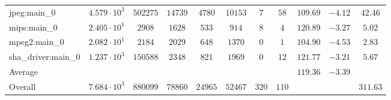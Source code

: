 \begin{tabular}{|l|c|c|c|c|c|c|c|c|c|c|}
jpeg:main\_0            & $ 4.579 \cdot 10^{3} $ & $ 502275 $ & $ 14739 $ & $ 4780  $ & $ 10153 $ & $ 7   $ & $ 58  $ & $ 109.69      $ & $ -4.12   $ & $ 42.46   $ \\
mips:main\_0            & $ 2.405 \cdot 10^{1} $ & $ 2908   $ & $ 1628  $ & $ 533   $ & $ 914   $ & $ 8   $ & $ 4   $ & $ 120.89      $ & $ -3.27   $ & $ 5.02    $ \\
mpeg2:main\_0           & $ 2.082 \cdot 10^{1} $ & $ 2184   $ & $ 2029  $ & $ 648   $ & $ 1370  $ & $ 0   $ & $ 1   $ & $ 104.90      $ & $ -4.53   $ & $ 2.83    $ \\
sha\_driver:main\_0     & $ 1.237 \cdot 10^{3} $ & $ 150588 $ & $ 2348  $ & $ 821   $ & $ 1969  $ & $ 0   $ & $ 12  $ & $ 121.77      $ & $ -3.21   $ & $ 5.67    $ \\
\hline
Average                 & $                    $ & $        $ & $       $ & $       $ & $       $ & $     $ & $     $ & $ 119.36      $ & $ -3.39   $ & $         $ \\
\hline
Overall                 & $ 7.684 \cdot 10^{3} $ & $ 880099 $ & $ 78860 $ & $ 24965 $ & $ 52467 $ & $ 320 $ & $ 110 $ & $             $ & $         $ & $ 311.63  $ \\
\hline
\end{tabular}
